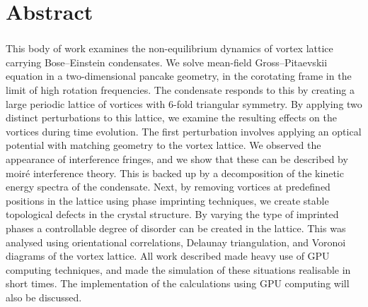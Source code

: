 \chapter*{Abstract}
\subsection*{\thesistitle}
\iffalse
Maximum 400 words, not to exceed one A4 page.

No figures or tables.  No references.  Just aims, brief methods, results, brief conclusions.

Avoid over-detailed technical method descriptions.

Should be readable to a literate science reader familiar with your general area, but not necessarily experts-only material

This will be published online within 3 months of award of the degree, as a minimum.  The entire thesis must be published within one year, unless restrictions apply (as above).
\fi
This body of work examines the non-equilibrium dynamics of vortex lattice carrying Bose--Einstein condensates. We solve mean-field Gross--Pitaevskii equation in a two-dimensional pancake geometry, in the corotating frame in the limit of high rotation frequencies. The condensate responds to this by creating a large periodic lattice of vortices with 6-fold triangular symmetry. By applying two distinct perturbations to this lattice, we examine the resulting effects on the vortices during time evolution. The first perturbation involves applying an optical potential with matching geometry to the vortex lattice. We observed the appearance of interference fringes, and we show that these can be described by moir\'e interference theory. This is backed up by a decomposition of the kinetic energy spectra of the condensate. Next, by removing vortices at predefined positions in the lattice using phase imprinting techniques, we create stable topological defects in the crystal structure. By varying the type of imprinted phases a controllable degree of disorder can be created in the lattice. This was analysed using orientational correlations, Delaunay triangulation, and Voronoi diagrams of the vortex lattice. All work described made heavy use of GPU computing techniques, and made the simulation of these situations realisable in short times. The implementation of the calculations using GPU computing will also be discussed.
